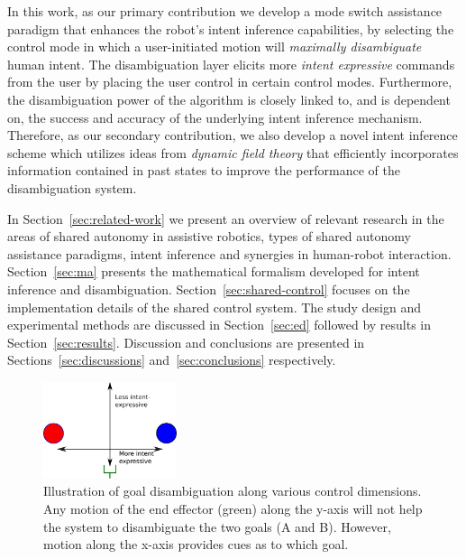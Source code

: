 \documentclass[natbib, twocolumn]{svjour3}          %
\begin{document}
In this work, as our primary contribution we develop a mode switch assistance paradigm that enhances the robot's intent inference capabilities, by selecting the control mode in which a user-initiated motion will \textit{maximally disambiguate} human intent. The disambiguation layer elicits more \textit{intent expressive} commands from the user by placing the user control in certain control modes. Furthermore, the disambiguation power of the algorithm is closely linked to, and is dependent on, the success and accuracy of the underlying intent inference mechanism. Therefore, as our secondary contribution, we also develop a novel intent inference scheme which utilizes ideas from \textit{dynamic field theory} that efficiently incorporates information contained in past states to improve the performance of the disambiguation system. 

In Section~\ref{sec:related-work} we present an overview of relevant research in the areas of shared autonomy in assistive robotics, types of shared autonomy assistance paradigms, intent inference and synergies in human-robot interaction. Section~\ref{sec:ma} presents the mathematical formalism developed for intent inference and disambiguation. Section~\ref{sec:shared-control} focuses on the implementation details of the shared control system. The study design and experimental methods are discussed in Section~\ref{sec:ed} followed by results in Section~\ref{sec:results}. Discussion and conclusions are presented in Sections~\ref{sec:discussions} and~\ref{sec:conclusions} respectively. 
\begin{figure}
	\begin{center}
		\includegraphics[width=0.35\textwidth]{Fig2.eps}
	\end{center}
	\caption{Illustration of goal disambiguation along various control dimensions. Any motion of the end effector (green) along the y-axis will not help the system to disambiguate the two goals (A and B). However, motion along the x-axis provides cues as to which goal.}
	\label{fig:disamb}
\end{figure}
\end{document}
